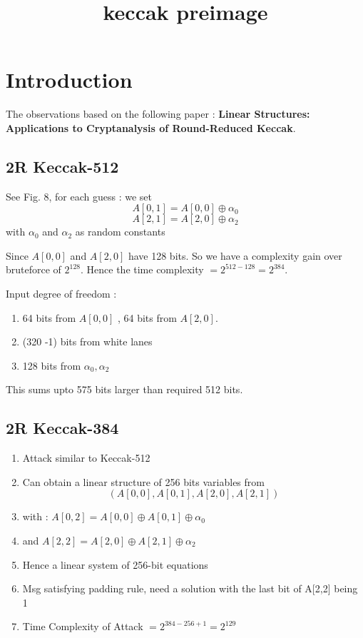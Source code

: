 \documentclass{article}
\title{keccak preimage}
\begin{document}
	
\maketitle

\section{Introduction}

The observations based on the following paper : \textbf{Linear Structures: Applications to Cryptanalysis of Round-Reduced Keccak}.

\subsection{2R Keccak-512}

See Fig. 8, for each guess :
we set 
\[
    A[0, 1] = A[0, 0] \oplus \alpha_{0}
\]
\[
    A[2, 1] = A[2, 0] \oplus \alpha_{2}
\]
with $\alpha_0$ and $\alpha_2$ as random constants

Since $A[0,0]$ and $A[2,0]$ have 128 bits. So we have a complexity gain over bruteforce of $2^{128}$. Hence the time complexity $= 2^{512 - 128} = 2^{384}$.

Input degree of freedom : 
\begin{enumerate}
    \item 64 bits from $A[0, 0]$ , 64 bits from $A[2,0]$.
    \item (320 -1) bits from white lanes
    \item 128 bits from $\alpha_0, \alpha_2$
\end{enumerate}

This sums upto 575 bits larger than required 512 bits.

\subsection{2R Keccak-384}

\begin{enumerate}
    \item Attack similar to Keccak-512
    \item Can obtain a linear structure of 256 bits variables from 
    \[
        (A[0, 0], A[0, 1], A[2, 0], A[2, 1])
    \]
    
    \item with : $A[0, 2] = A[0, 0] \oplus A[0, 1] \oplus \alpha_0$
    \item and $A[2, 2] = A[2, 0] \oplus A[2, 1] \oplus \alpha_2$
    \item Hence a linear system of 256-bit equations
    \item Msg satisfying padding rule, need a solution with the last bit of A[2,2] being 1
    \item Time Complexity of Attack $ = 2^{384 - 256 + 1} = 2^{129}$
\end{enumerate}
\end{document}
